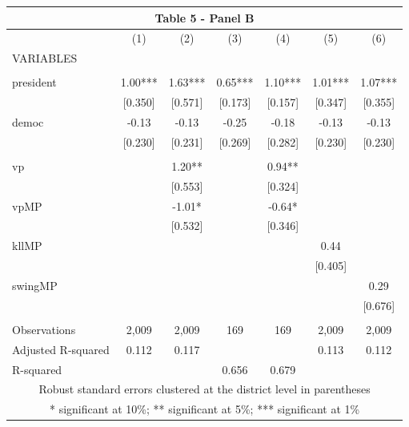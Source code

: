 \begin{tabular}{lcccccc}
\multicolumn{7}{c}{Table 5 - Panel B} \\ \hline
 & (1) & (2) & (3) & (4) & (5) & (6) \\
VARIABLES &  &  &  &  &  &  \\ \hline
 &  &  &  &  &  &  \\
president & 1.00*** & 1.63*** & 0.65*** & 1.10*** & 1.01*** & 1.07*** \\
 & [0.350] & [0.571] & [0.173] & [0.157] & [0.347] & [0.355] \\
democ & -0.13 & -0.13 & -0.25 & -0.18 & -0.13 & -0.13 \\
 & [0.230] & [0.231] & [0.269] & [0.282] & [0.230] & [0.230] \\
 &  &  &  &  &  &  \\
vp &  & 1.20** &  & 0.94** &  &  \\
 &  & [0.553] &  & [0.324] &  &  \\
vpMP &  & -1.01* &  & -0.64* &  &  \\
 &  & [0.532] &  & [0.346] &  &  \\
kllMP &  &  &  &  & 0.44 &  \\
 &  &  &  &  & [0.405] &  \\
swingMP &  &  &  &  &  & 0.29 \\
 &  &  &  &  &  & [0.676] \\
 &  &  &  &  &  &  \\
Observations & 2,009 & 2,009 & 169 & 169 & 2,009 & 2,009 \\
Adjusted R-squared & 0.112 & 0.117 &  &  & 0.113 & 0.112 \\
 R-squared &  &  & 0.656 & 0.679 &  &  \\ \hline
\multicolumn{7}{c}{ Robust standard errors clustered at the district level in parentheses} \\
\multicolumn{7}{c}{ * significant at 10\%; ** significant at 5\%; *** significant at 1\%} \\
\end{tabular}
